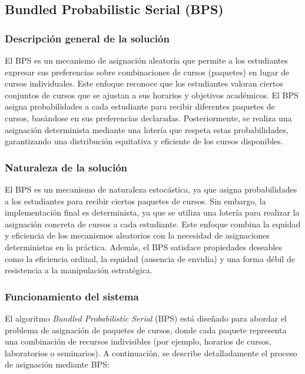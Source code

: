 \documentclass{article}
\begin{document}
\subsection{Bundled Probabilistic Serial (BPS)}

\subsubsection{Descripción general de la solución}

El BPS es un mecanismo de asignación aleatoria que permite a los estudiantes expresar sus preferencias sobre combinaciones de cursos (paquetes) en lugar de cursos individuales. Este enfoque reconoce que los estudiantes valoran ciertos conjuntos de cursos que se ajustan a sus horarios y objetivos académicos. El BPS asigna probabilidades a cada estudiante para recibir diferentes paquetes de cursos, basándose en sus preferencias declaradas. Posteriormente, se realiza una asignación determinista mediante una lotería que respeta estas probabilidades, garantizando una distribución equitativa y eficiente de los cursos disponibles.

\subsubsection{Naturaleza de la solución}

El BPS es un mecanismo de naturaleza estocástica, ya que asigna probabilidades a los estudiantes para recibir ciertos paquetes de cursos. Sin embargo, la implementación final es determinista, ya que se utiliza una lotería para realizar la asignación concreta de cursos a cada estudiante. Este enfoque combina la equidad y eficiencia de los mecanismos aleatorios con la necesidad de asignaciones deterministas en la práctica. Además, el BPS satisface propiedades deseables como la eficiencia ordinal, la equidad (ausencia de envidia) y una forma débil de resistencia a la manipulación estratégica.

\subsubsection{Funcionamiento del sistema}

El algoritmo \textit{Bundled Probabilistic Serial} (BPS) está diseñado para abordar el problema de asignación de paquetes de cursos, donde cada paquete representa una combinación de recursos indivisibles (por ejemplo, horarios de cursos, laboratorios o seminarios). A continuación, se describe detalladamente el proceso de asignación mediante BPS:
\end{document}
